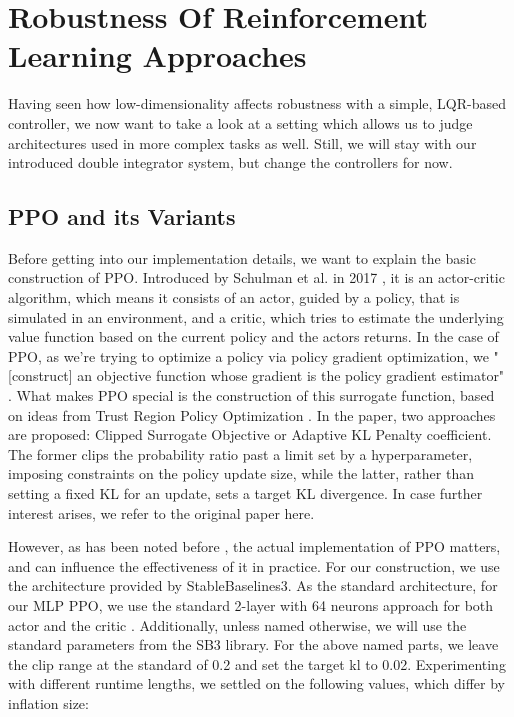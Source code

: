 \chapter{Robustness Of Reinforcement Learning Approaches}\label{chap:inflation}

Having seen how low-dimensionality affects robustness with a simple, LQR-based controller, we
now want to take a look at a setting which allows us to judge architectures used in more
complex tasks as well. Still, we will stay with our introduced double integrator system,
but change the controllers for now.

\section{PPO and its Variants}

Before getting into our implementation details, we want to explain the basic construction
of PPO. Introduced by Schulman et al. in 2017 , it is an actor-critic algorithm,
which means it consists of an actor, guided by a policy, that is simulated in an environment,
and a critic, which tries to estimate the underlying value function based on the current policy
and the actors returns. In the case of PPO, as we're trying to optimize a policy
via policy gradient optimization, we "[construct] an objective function whose gradient is the policy
gradient estimator" . What makes PPO special is the construction of this surrogate
function, based on ideas from Trust Region Policy Optimization . 
In the paper, two approaches are proposed: Clipped Surrogate Objective or Adaptive KL %
Penalty coefficient. The former clips the probability ratio past a limit set by a hyperparameter,
imposing constraints on the policy update size, while the latter, rather than setting
a fixed KL for an update, sets a target KL divergence. In case further interest
arises, we refer to the original paper here.

However, as has been noted before , the actual implementation of PPO matters,
and can influence the effectiveness of it in practice. For our construction, we use
the architecture provided by StableBaselines3.
As the standard architecture, for our MLP PPO, we use the standard 2-layer with 64 neurons approach for both
actor and the critic .
Additionally, unless named otherwise, we will use the standard parameters from the SB3 library.
For the above named parts, we leave the clip range at the standard of 0.2 and set the target kl to 0.02. 
Experimenting with different runtime lengths, we settled on the following values, which differ by inflation size:

